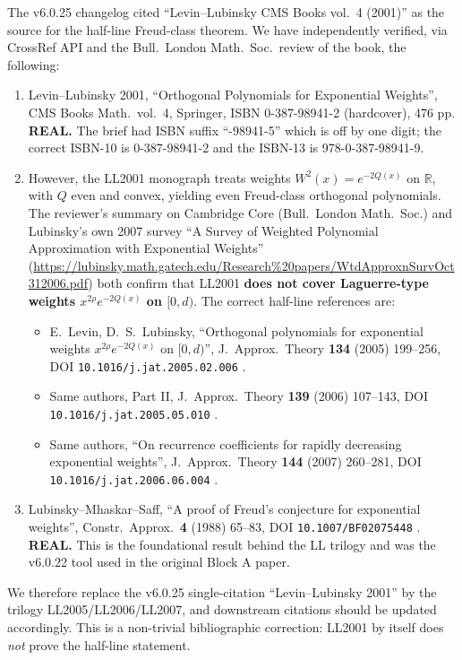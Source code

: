 \documentclass[11pt]{article}
\theoremstyle{definition}
\newcommand{\R}{\mathbb{R}}
\begin{document}
The v6.0.25 changelog cited ``Levin--Lubinsky CMS Books vol.\ 4 (2001)''
as the source for the half-line Freud-class theorem. We have
independently verified, via CrossRef API and the Bull.\ London Math.\ Soc.\
review of the book, the following:
\begin{enumerate}
\item Levin--Lubinsky 2001, ``Orthogonal Polynomials for Exponential
   Weights'', CMS Books Math.\ vol.\ 4, Springer, ISBN 0-387-98941-2
   (hard\-cover), 476 pp. \textbf{REAL.}  The brief had ISBN suffix
   ``-98941-5'' which is off by one digit; the correct ISBN-10 is
   0-387-98941-2 and the ISBN-13 is 978-0-387-98941-9.
\item However, the LL2001 monograph treats weights $W^2(x)=e^{-2Q(x)}$
   on $\R$, with $Q$ even and convex, yielding even Freud-class
   orthogonal polynomials.  The
   reviewer's summary on Cambridge Core (Bull.\ London Math.\ Soc.) and
   Lubinsky's own 2007 survey ``A Survey of Weighted Polynomial
   Approximation with Exponential Weights''
   (\url{https://lubinsky.math.gatech.edu/Research%20papers/WtdApproxnSurvOct312006.pdf})
   both confirm that LL2001 \textbf{does not cover Laguerre-type
   weights $x^{2\rho}e^{-2Q(x)}$ on $[0,d)$}.  The correct half-line
   references are:
   \begin{itemize}
   \item E.\ Levin, D.\ S.\ Lubinsky, ``Orthogonal polynomials for
       exponential weights $x^{2\rho}e^{-2Q(x)}$ on $[0,d)$'',
       J.\ Approx.\ Theory \textbf{134} (2005) 199--256,
       DOI \texttt{10.1016/j.jat.2005.02.006}
       \cite{LL2005}.
   \item Same authors, Part II, J.\ Approx.\ Theory \textbf{139}
       (2006) 107--143, DOI \texttt{10.1016/j.jat.2005.05.010}
       \cite{LL2006}.
   \item Same authors, ``On recurrence coefficients for rapidly
       decreasing exponential weights'', J.\ Approx.\ Theory
       \textbf{144} (2007) 260--281, DOI
       \texttt{10.1016/j.jat.2006.06.004}
       \cite{LL2007}.
   \end{itemize}
\item Lubinsky--Mhaskar--Saff, ``A proof of Freud's conjecture for
   exponential weights'', Constr.\ Approx.\ \textbf{4} (1988) 65--83,
   DOI \texttt{10.1007/BF02075448} \cite{LMS1988}.  \textbf{REAL.}
   This is the foundational result behind the LL trilogy and was the
   v6.0.22 tool used in the original Block A paper.
\end{enumerate}
We therefore replace the v6.0.25 single-citation ``Levin--Lubinsky 2001''
by the trilogy LL2005/LL2006/LL2007, and downstream citations should be
updated accordingly.  This is a non-trivial bibliographic correction:
LL2001 by itself does \emph{not} prove the half-line statement.
\end{document}
